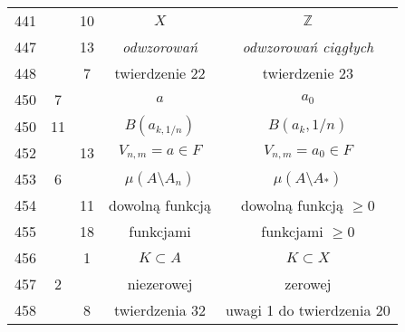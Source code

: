 \documentclass[a4paper,11pt]{article}
\begin{document}
\begin{center}
\begin{tabular}{|c|c|c|c|c|}
    441 & & 10 & $X$ & $\mathbb{Z}$ \\
    447 & & 13 & \emph{odwzorowań} & \emph{odwzorowań ciągłych} \\
    448 & &  7 & twierdzenie 22 & twierdzenie 23 \\
    450 &  7 & & $a$ & $a_{ 0 }$ \\
    450 & 11 & & $B( a_{ k, 1/n } )$ & $B( a_{ k }, 1/n )$ \\
    452 & & 13 & $V_{ n, m } = a \in F$ & $V_{ n, m } = a_{ 0 } \in F$ \\
    453 &  6 & & $\mu( A \setminus A_{ n } )$
           & $\mu( A \setminus A_{ * } )$ \\
    454 & & 11 & dowolną funkcją & dowolną funkcją $\geq 0$ \\
    455 & & 18 & funkcjami & funkcjami $\geq 0$ \\
    456 & &  1 & $K \subset A$ & $K \subset X$ \\
    457 &  2 & & niezerowej & zerowej \\
    458 & &  8 & twierdzenia 32 & uwagi 1 do twierdzenia 20 \\
    \hline
  \end{tabular}


\end{center}
\end{document}

